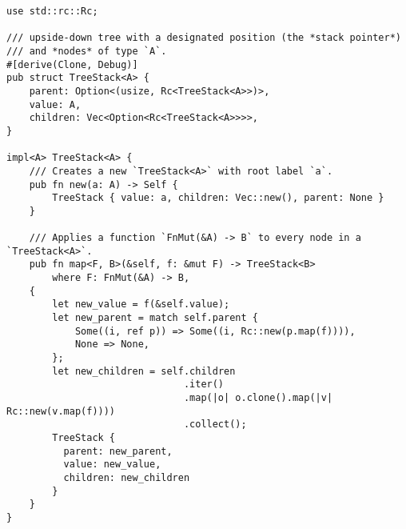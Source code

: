 \documentclass[DIV13]{scrartcl}
\begin{document}
\begin{lstlisting}
use std::rc::Rc;

/// upside-down tree with a designated position (the *stack pointer*)
/// and *nodes* of type `A`.
#[derive(Clone, Debug)]
pub struct TreeStack<A> {
    parent: Option<(usize, Rc<TreeStack<A>>)>,
    value: A,
    children: Vec<Option<Rc<TreeStack<A>>>>,
}

impl<A> TreeStack<A> {
    /// Creates a new `TreeStack<A>` with root label `a`.
    pub fn new(a: A) -> Self {
        TreeStack { value: a, children: Vec::new(), parent: None }
    }

    /// Applies a function `FnMut(&A) -> B` to every node in a `TreeStack<A>`.
    pub fn map<F, B>(&self, f: &mut F) -> TreeStack<B>
        where F: FnMut(&A) -> B,
    {
        let new_value = f(&self.value);
        let new_parent = match self.parent {
            Some((i, ref p)) => Some((i, Rc::new(p.map(f)))),
            None => None,
        };
        let new_children = self.children
                               .iter()
                               .map(|o| o.clone().map(|v| Rc::new(v.map(f))))
                               .collect();
        TreeStack {
          parent: new_parent,
          value: new_value,
          children: new_children
        }
    }
}
\end{lstlisting}
\end{document}
